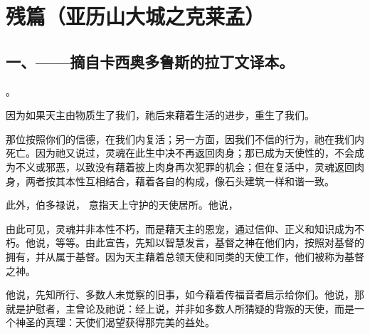 
\chapter{残篇（亚历山大城之克莱孟）}



\section{一、——摘自卡西奥多鲁斯的拉丁文译本。}

。\par

 因为如果天主由物质生了我们，祂后来藉着生活的进步，重生了我们。\par

那位按照你们的信德，在我们内复活；另一方面，因我们不信的行为，祂在我们内死亡。因为祂又说过，灵魂在此生中决不再返回肉身；那已成为天使性的，不会成为不义或邪恶，以致没有藉着披上肉身再次犯罪的机会；但在复活中，灵魂返回肉身，两者按其本性互相结合，藉着各自的构成，像石头建筑一样和谐一致。\par

此外，伯多禄说， 意指天上守护的天使居所。他说，\par

由此可见，灵魂并非本性不朽，而是藉天主的恩宠，通过信仰、正义和知识成为不朽。他说，等等。由此宣告，先知以智慧发言，基督之神在他们内，按照对基督的拥有，并从属于基督。因为天主藉着总领天使和同类的天使工作，他们被称为基督之神。\par

他说，先知所行、多数人未觉察的旧事，如今藉着传福音者启示给你们。他说，那就是护慰者，主曾论及祂说：经上说，并非如多数人所猜疑的背叛的天使，而是一个神圣的真理：天使们渴望获得那完美的益处。\par

